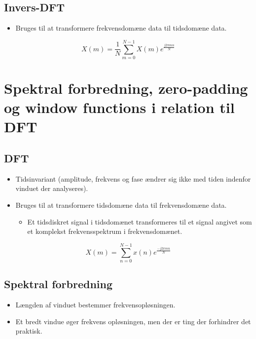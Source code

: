 \documentclass[danish]{article}
\begin{document}
\subsection{Invers-DFT}
\begin{itemize}
	\item Bruges til at transformere frekvensdomæne data til tidsdomæne data.
\end{itemize}

\begin{equation}
X(m)=\frac{1}{N}\sum_{m=0}^{N-1}X(m)e^{\frac{j2\pi mn}{N}}
\end{equation}



\newpage
\section{Spektral forbredning, zero-padding og window functions i relation til DFT}
\subsection{DFT}
\begin{itemize}
	\item Tidsinvariant (amplitude, frekvens og fase ændrer sig ikke med tiden indenfor vinduet der analyseres).
	\item Bruges til at transformere tidsdomæne data til frekvensdomæne data.
	\begin{itemize}
		\item Et tidsdiskret signal i tidsdomænet transformeres til et signal angivet som et komplekst frekvensspektrum i frekvensdomænet.
	\end{itemize}
\end{itemize}

\begin{equation}
X(m)=\sum_{n=0}^{N-1}x(n)e^{\frac{-j2\pi mn}{N}}
\end{equation}

\subsection{Spektral forbredning}
\begin{itemize}
	\item Længden af vinduet bestemmer frekvensopløsningen.
	\item Et bredt vindue øger frekvens opløsningen, men der er ting der forhindrer det praktisk.
\end{itemize}
\end{document}
